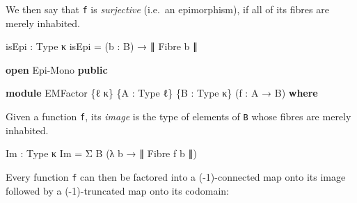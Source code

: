 \documentclass[
  11pt,
  oneside,
  article]{memoir}
\newenvironment{Shaded}{}{}
\newcommand{\KeywordTok}[1]{\textcolor[rgb]{0.00,0.44,0.13}{\textbf{#1}}}
\newcommand{\NormalTok}[1]{#1}
\newcommand{\OtherTok}[1]{\textcolor[rgb]{0.00,0.44,0.13}{#1}}
\theoremstyle{definition}
\theoremstyle{plain}
\newcommand{\0}{\textsf{0}}
\newcommand{\1}{\tn{\textsf{1}}}
\begin{document}
We then say that \texttt{f} is \emph{surjective} (i.e.~an epimorphism),
if all of its fibres are merely inhabited.

\begin{Shaded}
\begin{Highlighting}[]
\NormalTok{    isEpi }\OtherTok{:}\NormalTok{ Type κ}
\NormalTok{    isEpi }\OtherTok{=} \OtherTok{(}\NormalTok{b }\OtherTok{:}\NormalTok{ B}\OtherTok{)} \OtherTok{→}\NormalTok{ ∥ Fibre b ∥}

\KeywordTok{open}\NormalTok{ Epi{-}Mono }\KeywordTok{public}

\KeywordTok{module}\NormalTok{ EMFactor }\OtherTok{\{}\NormalTok{ℓ κ}\OtherTok{\}} \OtherTok{\{}\NormalTok{A }\OtherTok{:}\NormalTok{ Type ℓ}\OtherTok{\}} \OtherTok{\{}\NormalTok{B }\OtherTok{:}\NormalTok{ Type κ}\OtherTok{\}} \OtherTok{(}\NormalTok{f }\OtherTok{:}\NormalTok{ A }\OtherTok{→}\NormalTok{ B}\OtherTok{)} \KeywordTok{where}
\end{Highlighting}
\end{Shaded}

Given a function \texttt{f}, its \emph{image} is the type of elements of
\texttt{B} whose fibres are merely inhabited.

\begin{Shaded}
\begin{Highlighting}[]
\NormalTok{    Im }\OtherTok{:}\NormalTok{ Type κ}
\NormalTok{    Im }\OtherTok{=}\NormalTok{ Σ B }\OtherTok{(λ}\NormalTok{ b }\OtherTok{→}\NormalTok{ ∥ Fibre f b ∥}\OtherTok{)}
\end{Highlighting}
\end{Shaded}

Every function \texttt{f} can then be factored into a (-1)-connected map
onto its image followed by a (-1)-truncated map onto its codomain:
\end{document}
